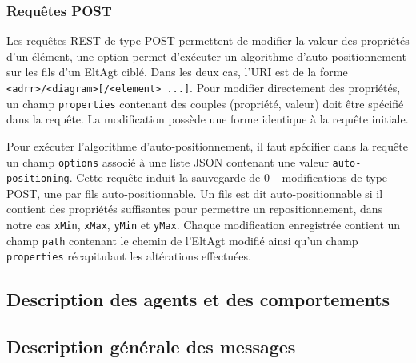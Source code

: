\subsubsection{Requêtes POST}
Les requêtes REST de type POST permettent de modifier la valeur des propriétés d'un élément, une option permet d’exécuter un algorithme d'auto-positionnement sur les fils d'un EltAgt ciblé.
Dans les deux cas, l'URI est de la forme \lstinline$<adrr>/<diagram>[/<element> ...]$.
Pour modifier directement des propriétés, un champ \lstinline$properties$ contenant des couples (propriété, valeur) doit être spécifié dans la requête.
La modification possède une forme identique à la requête initiale.

Pour exécuter l'algorithme d'auto-positionnement, il faut spécifier dans la requête un champ \lstinline$options$ associé à une liste JSON contenant une valeur \lstinline$auto-positioning$.
Cette requête induit la sauvegarde de 0+ modifications de type POST, une par fils auto-positionnable. Un fils est dit auto-positionnable si il contient des propriétés suffisantes pour permettre un repositionnement, dans notre cas \lstinline$xMin$, \lstinline$xMax$, \lstinline$yMin$ et \lstinline$yMax$.
Chaque modification enregistrée contient un champ \lstinline$path$ contenant le chemin de l'EltAgt modifié ainsi qu'un champ \lstinline$properties$ récapitulant les altérations effectuées.

\subsection{Description des agents et des comportements}

\subsection{Description générale des messages}

